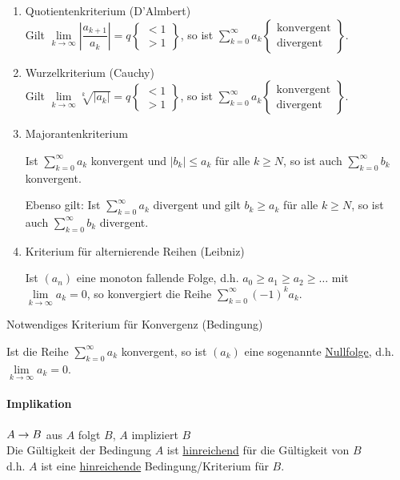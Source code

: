 \begin{enumerate}
	\item Quotientenkriterium (D'Almbert)\\
	Gilt $\lim\limits_{k\to\infty}\left|\dfrac{a_{k+1}}{a_k}\right| = q\left\{\begin{array}{c}{<1}\\{>1}\end{array}\right\}$, so ist $\sum\limits_{k=0}^{\infty}a_k\left\{\begin{array}{c}\text{konvergent}\\\text{divergent}\end{array}\right\}$.
	
	\item Wurzelkriterium (Cauchy)\\
	Gilt $\lim\limits_{k\to\infty}\sqrt[k]{|a_k|} = q\left\{\begin{array}{c}{<1}\\{>1}\end{array}\right\}$, so ist $\sum\limits_{k=0}^{\infty}a_k\left\{\begin{array}{c}\text{konvergent}\\\text{divergent}\end{array}\right\}$.
	
	\item Majorantenkriterium 
	
	Ist $\sum\limits_{k=0}^{\infty}a_k$ konvergent und $|b_k|\le a_k$ für alle $k\ge N$, so ist auch $\sum\limits_{k=0}^{\infty}b_k$ konvergent.
	
	Ebenso gilt: Ist $\sum\limits_{k=0}^{\infty}a_k$ divergent und gilt $b_k\ge a_k$ für alle $k\ge N$, so ist auch $\sum\limits_{k=0}^{\infty}b_k$ divergent.
	
	\item Kriterium für alternierende Reihen (Leibniz)
	
	Ist $(a_n)$ eine monoton fallende Folge, d.h. $a_0\ge a_1\ge a_2\ge \ldots$ mit $\lim\limits_{k\to\infty}a_k = 0$, so konvergiert die Reihe $\sum\limits_{k=0}^{\infty}(-1)^ka_k$.
\end{enumerate}

\Bem Notwendiges Kriterium für Konvergenz (Bedingung)

Ist die Reihe $\sum\limits_{k=0}^{\infty}a_k$ konvergent, so ist $(a_k)$ eine sogenannte \ul{Nullfolge}, d.h. $\lim\limits_{k\to\infty}a_k = 0$.

\paragraph{Implikation} $A\rightarrow B$ {\flqq aus $A$ folgt $B$\frqq}, {\flqq $A$ impliziert $B$\frqq}\\
Die Gültigkeit der Bedingung $A$ ist \ul{hinreichend} für die Gültigkeit von $B$\\
d.h. $A$ ist eine \ul{hinreichende} Bedingung/Kriterium für $B$.

